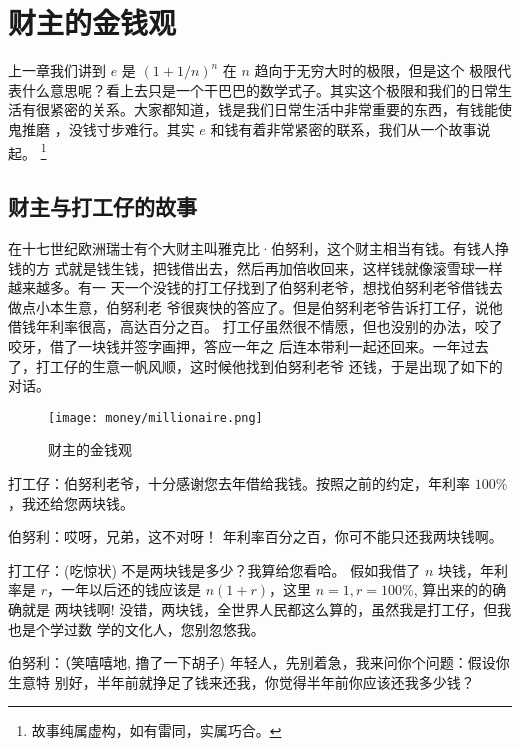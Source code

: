 %

\chapter{财主的金钱观}

上一章我们讲到 $e$ 是 $(1+ 1/n)^n$ 在 $n$ 趋向于无穷大时的极限，但是这个
极限代表什么意思呢？看上去只是一个干巴巴的数学式子。其实这个极限和我们的日常生
活有很紧密的关系。大家都知道，钱是我们日常生活中非常重要的东西，有钱能使鬼推磨
，没钱寸步难行。其实 $e$ 和钱有着非常紧密的联系，我们从一个故事说起。
\footnote{
故事纯属虚构，如有雷同，实属巧合。
}

\section{财主与打工仔的故事}
在十七世纪欧洲瑞士有个大财主叫雅克比·伯努利，这个财主相当有钱。有钱人挣钱的方
式就是钱生钱，把钱借出去，然后再加倍收回来，这样钱就像滚雪球一样越来越多。有一
天一个没钱的打工仔找到了伯努利老爷，想找伯努利老爷借钱去做点小本生意，伯努利老
爷很爽快的答应了。但是伯努利老爷告诉打工仔，说他借钱年利率很高，高达百分之百。
打工仔虽然很不情愿，但也没别的办法，咬了咬牙，借了一块钱并签字画押，答应一年之
后连本带利一起还回来。一年过去了，打工仔的生意一帆风顺，这时候他找到伯努利老爷
还钱，于是出现了如下的对话。

\begin{figure}[htbp]
\centering
\texttt{[image: money/millionaire.png]}
\caption{财主的金钱观}
\centering
\end{figure}

\noindent

打工仔：伯努利老爷，十分感谢您去年借给我钱。按照之前的约定，年利率 $100\%$，我还给您两块钱。 

伯努利：哎呀，兄弟，这不对呀！ 年利率百分之百，你可不能只还我两块钱啊。

打工仔：(吃惊状) 不是两块钱是多少？我算给您看哈。 假如我借了 $n$ 块钱，年利率是
$r$，一年以后还的钱应该是 $n(1 +r)$，这里 $n=1, r=100\%$, 算出来的的确确就是
两块钱啊!  没错，两块钱，全世界人民都这么算的，虽然我是打工仔，但我也是个学过数
学的文化人，您别忽悠我。

伯努利：（笑嘻嘻地, 撸了一下胡子) 年轻人，先别着急，我来问你个问题：假设你生意特
别好，半年前就挣足了钱来还我，你觉得半年前你应该还我多少钱？

